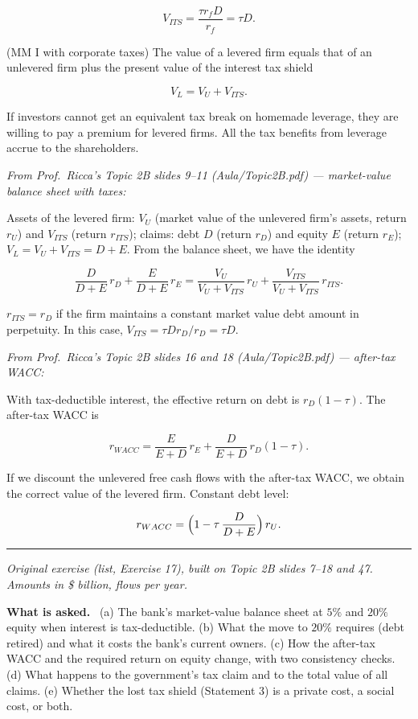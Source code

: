\documentclass[11pt,a4paper]{article}
\numberwithin{equation}{section}
\newcommand{\asked}{\par\medskip\noindent\textbf{What is asked.}~}
\newcommand{\stmtend}{\par\endgroup\nopagebreak\noindent\rule{\linewidth}{0.4pt}\par\medskip}
\begin{document}
\[V_{ITS} = \frac{\tau r_f D}{r_f} = \tau D.\]

(MM I with corporate taxes) The value of a levered firm equals that of an unlevered firm plus the
present value of the interest tax shield

\[V_L = V_U + V_{ITS}.\]

If investors cannot get an equivalent tax break on homemade leverage, they are willing to pay a
premium for levered firms. All the tax benefits from leverage accrue to the shareholders.

\emph{From Prof.~Ricca's Topic 2B slides 9--11 (Aula/Topic2B.pdf) --- market-value balance sheet
with taxes:}

Assets of the levered firm: \(V_U\) (market value of the unlevered firm's assets, return \(r_U\))
and \(V_{ITS}\) (return \(r_{ITS}\)); claims: debt \(D\) (return \(r_D\)) and equity \(E\) (return
\(r_E\)); \(V_L = V_U + V_{ITS} = D + E\). From the balance sheet, we have the identity

\[\frac{D}{D + E}\,r_D + \frac{E}{D + E}\,r_E = \frac{V_U}{V_U + V_{ITS}}\,r_U + \frac{V_{ITS}}{V_U + V_{ITS}}\,r_{ITS}.\]

\(r_{ITS} = r_D\) if the firm maintains a constant market value debt amount in perpetuity. In this
case, \(V_{ITS} = \tau D r_D / r_D = \tau D\).

\emph{From Prof.~Ricca's Topic 2B slides 16 and 18 (Aula/Topic2B.pdf) --- after-tax WACC:}

With tax-deductible interest, the effective return on debt is \(r_D(1 - \tau)\). The after-tax WACC
is

\[r_{WACC} = \frac{E}{E + D}\,r_E + \frac{D}{E + D}\,r_D(1 - \tau).\]

If we discount the unlevered free cash flows with the after-tax WACC, we obtain the correct value of
the levered firm. Constant debt level:

\[r_{WACC} = \Bigl(1 - \tau\,\frac{D}{D + E}\Bigr)\,r_U.\]
\stmtend

\noindent\textit{Original exercise (list, Exercise 17), built on Topic 2B slides 7--18 and 47.
Amounts in \$ billion, flows per year.}

\asked
(a) The bank's market-value balance sheet at $5\%$ and $20\%$ equity when interest is tax-deductible.
(b) What the move to $20\%$ requires (debt retired) and what it costs the bank's current owners.
(c) How the after-tax WACC and the required return on equity change, with two consistency checks.
(d) What happens to the government's tax claim and to the total value of all claims.
(e) Whether the lost tax shield (Statement 3) is a private cost, a social cost, or both.
\end{document}
